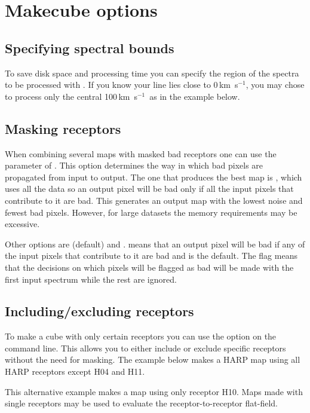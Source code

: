 \documentclass[11pt,oneside,chapters]{starlink}
\newcommand{\kms}{\mbox{$\,$km~s$^{-1}$}}   %
\newcommand{\kms}{\,km~s$^{-1}$}   %
\begin{document}
\section{Makecube options}

\subsection{Specifying spectral bounds}

To save disk space and processing time you can specify the region of
the spectra to be processed with . If you know your
line lies close to 0\kms, you may chose to process only the central
100\kms\ as in the example below.
\begin{terminalv}
\end{terminalv}

\subsection{Masking receptors}

When combining several maps with masked bad receptors one can use the
 parameter of \makecube. This option determines the way
in which bad pixels are propagated from input to output. The one that
produces the best map is , which uses all the data
so an output pixel will be bad only if all the input pixels that
contribute to it are bad. This generates an output map with the lowest
noise and fewest bad pixels. However, for large datasets the memory
requirements may be excessive.

Other options are  (default) and
.  means that an output pixel will be
bad if any of the input pixels that contribute to it are bad and is
the default.  The flag  means that the decisions on which pixels
will be flagged as bad will be made with the first input spectrum
while the rest are ignored.

\subsection{Including/excluding receptors}
\label{sec:incexc_receptors}

To make a cube with only certain receptors you can use the
 option on the command line. This allows you to
either include or exclude specific receptors without the need for
masking. The example below makes a HARP map using all HARP
receptors except H04 and H11.
\begin{terminalv}
\end{terminalv}
This alternative example makes a map using only receptor H10. Maps
made with single receptors may be used to evaluate the
receptor-to-receptor flat-field.
\begin{terminalv}
\end{terminalv}
\end{document}
